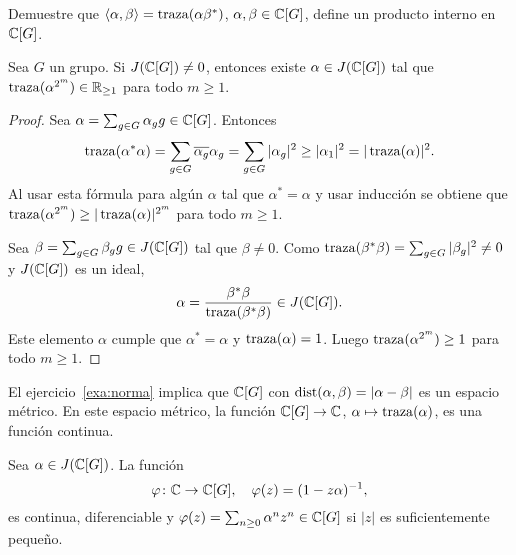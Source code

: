 \begin{exercise}
	Demuestre que 
	$\langle\alpha,\beta\rangle=\operatorname{traza}(\alpha\beta^*)$, $\alpha,\beta\in\mathbb{C}[G]$, 
	define un producto interno en $\mathbb{C}[G]$.
\end{exercise}

\begin{lemma}
	\label{lem:algebraico}
	Sea $G$ un grupo. Si $J(\mathbb{C}[G])\ne 0$, entonces existe $\alpha\in J(\mathbb{C}[G])$ tal que 
	$\operatorname{traza}(\alpha^{2^m})\in\mathbb{R}_{\geq1}$ 
	para todo $m\geq1$.
\end{lemma}

\begin{proof}
	Sea $\alpha=\sum_{g\in G}\alpha_gg\in\mathbb{C}[G]$. Entonces	
	\[
		\operatorname{traza}(\alpha^*\alpha)
		=\sum_{g\in G}\overline{\alpha_g}\alpha_g
		=\sum_{g\in G}|\alpha_g|^2\geq|\alpha_1|^2
		=|\operatorname{traza}(\alpha)|^2.
	\]
	Al usar esta fórmula para algún $\alpha$ tal que $\alpha^*=\alpha$ y usar
	inducción se obtiene que $\operatorname{traza}(\alpha^{2^m})\geq|\operatorname{traza}(\alpha)|^{2^m}$
	para todo $m\geq1$. 

	Sea $\beta=\sum_{g\in G}\beta_gg\in J(\mathbb{C}[G])$ tal que $\beta\ne0$. Como
	$\operatorname{traza}(\beta^*\beta)=\sum_{g\in G}|\beta_g|^2\ne0$ y $J(\mathbb{C}[G])$ es un ideal, 
	\[
		\alpha=\frac{\beta^*\beta}{\operatorname{traza}(\beta^*\beta)}\in J(\mathbb{C}[G]).
	\]
	Este elemento $\alpha$ cumple que $\alpha^*=\alpha$ y $\operatorname{traza}(\alpha)=1$.
	Luego $\operatorname{traza}(\alpha^{2^m})\geq 1$ para todo $m\geq1$.
\end{proof}

El ejercicio~\ref{exa:norma} implica que $\mathbb{C}[G]$ con
$\mathrm{dist}(\alpha,\beta)=|\alpha-\beta|$ es un espacio métrico. En este espacio
métrico, la función $\mathbb{C}[G]\to\mathbb{C}$, $\alpha\mapsto \operatorname{traza}(\alpha)$, es una
función continua.

\begin{lemma}
	\label{lem:phi_diferenciable}
	Sea $\alpha\in J(\mathbb{C}[G])$. La función
	\[
		\varphi\colon\mathbb{C}\to\mathbb{C}[G],\quad
		\varphi(z)=(1-z\alpha)^{-1},
	\]
	es continua, diferenciable y $\varphi(z)=\sum_{n\geq0}\alpha^nz^n\in\mathbb{C}[G]$ si $|z|$
	es suficientemente pequeño.
\end{lemma}


